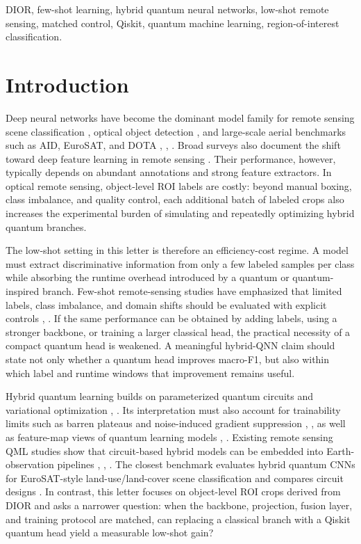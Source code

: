 \documentclass[journal]{IEEEtran}
\begin{document}
\begin{IEEEkeywords}
DIOR, few-shot learning, hybrid quantum neural networks, low-shot remote sensing, matched control, Qiskit, quantum machine learning, region-of-interest classification.
\end{IEEEkeywords}

\section{Introduction}
Deep neural networks have become the dominant model family for remote sensing scene classification \cite{cheng2017rsi}, optical object detection \cite{li2020dior}, and large-scale aerial benchmarks such as AID, EuroSAT, and DOTA \cite{xia2017aid}, \cite{helber2019eurosat}, \cite{xia2018dota}. Broad surveys also document the shift toward deep feature learning in remote sensing \cite{zhu2017deep}. Their performance, however, typically depends on abundant annotations and strong feature extractors. In optical remote sensing, object-level ROI labels are costly: beyond manual boxing, class imbalance, and quality control, each additional batch of labeled crops also increases the experimental burden of simulating and repeatedly optimizing hybrid quantum branches.

The low-shot setting in this letter is therefore an efficiency-cost regime. A model must extract discriminative information from only a few labeled samples per class while absorbing the runtime overhead introduced by a quantum or quantum-inspired branch. Few-shot remote-sensing studies have emphasized that limited labels, class imbalance, and domain shifts should be evaluated with explicit controls \cite{qiu2024fewshot}, \cite{zhang2023gfrod}. If the same performance can be obtained by adding labels, using a stronger backbone, or training a larger classical head, the practical necessity of a compact quantum head is weakened. A meaningful hybrid-QNN claim should state not only whether a quantum head improves macro-F1, but also within which label and runtime windows that improvement remains useful.

Hybrid quantum learning builds on parameterized quantum circuits and variational optimization \cite{biamonte2017qml}, \cite{cerezo2021vqa}. Its interpretation must also account for trainability limits such as barren plateaus and noise-induced gradient suppression \cite{mcclean2018barren}, \cite{wang2021noise}, as well as feature-map views of quantum learning models \cite{havlicek2019supervised}, \cite{schuld2019feature}. Existing remote sensing QML studies show that circuit-based hybrid models can be embedded into Earth-observation pipelines \cite{sebastianelli2022circuit}, \cite{zhang2023hybrid}, \cite{fan2025hybrid}. The closest benchmark evaluates hybrid quantum CNNs for EuroSAT-style land-use/land-cover scene classification and compares circuit designs \cite{sebastianelli2022circuit}. In contrast, this letter focuses on object-level ROI crops derived from DIOR and asks a narrower question: when the backbone, projection, fusion layer, and training protocol are matched, can replacing a classical branch with a Qiskit quantum head yield a measurable low-shot gain?
\end{document}
